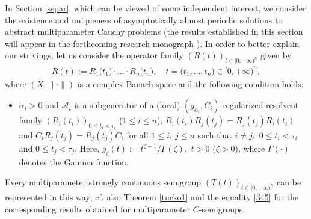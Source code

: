 \documentclass{amsart}
\theoremstyle{definition}
\theoremstyle{remark}
\numberwithin{equation}{section}
\begin{document}
In Section \ref{separ}, which can be viewed of some independent interest, we consider the existence and uniqueness of asymptotically almost periodic solutions to abstract multiparameter Cauchy problems (the results established in this section will appear in the forthcoming research monograph \cite{apsclcs}). In order to better explain our strivings, let us consider the operator family $(R(t))_{t\in [0,+\infty)^{n}}$ given by 
\begin{align}\label{prod} R(t):=R_{1}\bigl(t_{1}\bigr)\cdot...\cdot R_{n}\bigl(t_{n}\bigr),\quad t=\bigl(t_{1},...,t_{n}\bigr)\in [0,+\infty)^{n},
\end{align}
where $(X,\| \cdot \| )$ is a complex Banach space and the following condition holds:
\begin{itemize}
\item[(D1)] $\alpha_{i}>0$ and ${\mathcal A}_{i}$ is a subgenerator of a (local) $(g_{\alpha_{i}},C_{i})$-regularized resolvent family $(R_{i}(t_{i}))_{0\leq t_{i}<\tau_{i}}$ ($1\leq i\leq n$), $R_{i}(t_{i})R_{j}(t_{j})= R_{j}(t_{j})R_{i}(t_{i})$ and $C_{i}R_{j}(t_{j})=R_{j}(t_{j})C_{i}$ for all $1\leq i, \ j\leq n $ such that $i\neq j,$ $0\leq t_{i}<\tau_{i}$ and $0\leq t_{j}<\tau_{j}.$ Here, $g_{\zeta}(t):=t^{\zeta-1}/\Gamma(\zeta),$ $t>0$ ($\zeta>0 $), where $\Gamma(\cdot)$ denotes the Gamma function.
\end{itemize}
Every multiparameter strongly continuous semigroup $(T(t))_{t\in [0,+\infty)^{n}}$ can be represented in this way; cf. also Theorem \ref{tucko1} and the equality \eqref{345} for the corresponding results obtained for multiparameter $C$-semigroups.
\end{document}
